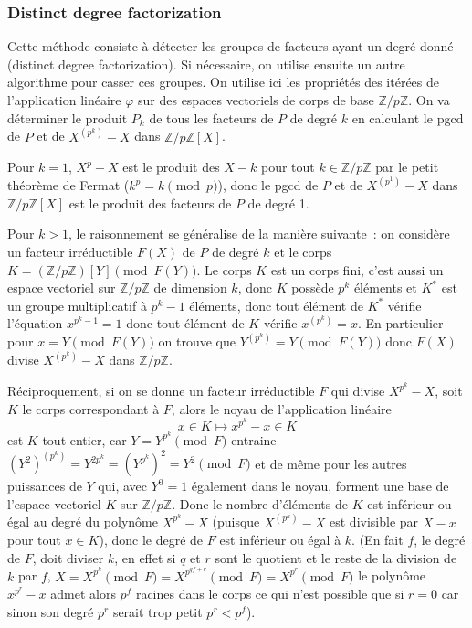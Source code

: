 \documentclass[a4paper,11pt]{article}
\begin{document}
\begin{giacjshere}
\subsubsection{Distinct degree factorization} 
Cette méthode consiste à détecter les groupes de facteurs
ayant un degré donné (distinct degree factorization). Si nécessaire, 
on utilise ensuite un autre algorithme pour casser ces groupes.
On utilise ici les propriétés des itérées de l'application linéaire 
$\varphi$ sur des espaces vectoriels de corps de base $\mathbb{Z}/p\mathbb{Z}$.
On va déterminer le produit $P_k$ de tous les facteurs de $P$ de degré $k$
en calculant le pgcd de $P$ et de $X^{(p^k)}-X$ dans $\mathbb{Z}/p\mathbb{Z}[X]$.

Pour $k=1$, $X^p-X$ est le produit des $X-k$ pour tout $k\in \mathbb{Z}/p\mathbb{Z}$
par le petit théorème de Fermat ($k^p=k \pmod p$), donc le pgcd
de $P$ et de $X^{(p^1)}-X$ dans $\mathbb{Z}/p\mathbb{Z}[X]$ est le produit des facteurs
de $P$ de degré 1.

Pour $k>1$, le raisonnement se généralise de la manière suivante~: on
considère un facteur irréductible $F(X)$ de $P$ de degré $k$ et le corps
$K=(\mathbb{Z}/p\mathbb{Z})[Y] \pmod{F(Y)}$. Le corps $K$ est un corps fini, c'est
aussi un espace vectoriel sur $\mathbb{Z}/p\mathbb{Z}$ de dimension $k$, donc $K$ possède
$p^k$ éléments et $K^*$ est un groupe multiplicatif à $p^k-1$ éléments,
donc tout élément de $K^*$ vérifie l'équation $x^{p^k-1}=1$ donc
tout élément de $K$ vérifie $x^{(p^k)}=x$. En particulier pour 
$x=Y \pmod {F(Y)}$ 
on trouve que $Y^{(p^k)}=Y \pmod {F(Y)}$ donc $F(X)$ divise $X^{(p^k)}-X$
dans $\mathbb{Z}/p\mathbb{Z}$.

Réciproquement, si on se donne un facteur irréductible $F$ qui divise
$X^{p^k}-X$, soit $K$ le corps correspondant à $F$, 
alors le noyau de l'application linéaire
\[ x \in K \mapsto x^{p^k}-x \in K \]
est $K$ tout entier, car $Y=Y^{p^k} \pmod F$
entraine $(Y^2)^{(p^k)}=Y^{2 p^k}=(Y^{p^k})^2=Y^2 \pmod F$ et de même
pour les autres puissances de $Y$ qui, avec $Y^0=1$ également dans le
noyau, forment une base de l'espace vectoriel $K$ sur $\mathbb{Z}/p\mathbb{Z}$. Donc le
nombre d'éléments de $K$ est inférieur ou égal au degré du polynôme
$X^{p^k}-X$ (puisque $X^{(p^k)}-X$ est divisible par
$X-x$ pour tout $x\in K$),
donc le degré de $F$ est inférieur ou égal à $k$.
(En fait $f$, le degré de $F$, doit diviser $k$, en effet
si $q$ et $r$ sont le quotient et le reste de la division de $k$ par $f$,
$X=X^{p^k} \pmod F =X^{p^{qf+r}} \pmod F=X^{p^r} \pmod F$
le polyn\^ome $x^{p^r}-x$ admet alors $p^f$ racines dans le corps
ce qui n'est possible que si $r=0$ car sinon son degr\'e 
$p^r$ serait trop petit $p^r<p^f$).


\end{giacjshere}
\end{document}
